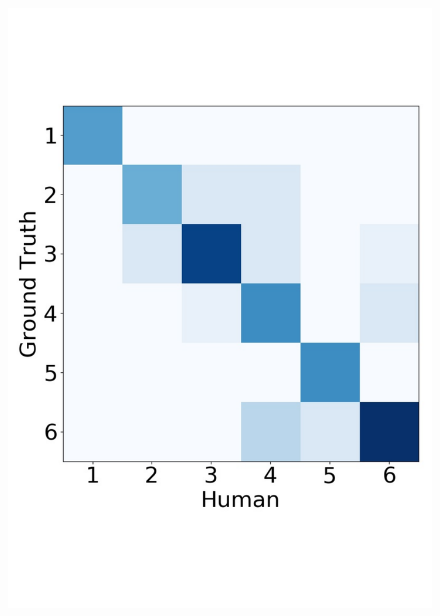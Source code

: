 \begin{figure}
{\begin{minipage}{0.25\linewidth}
			\includegraphics[width=1\linewidth]{human_6_pair}
	\end{minipage}}
\end{figure}
